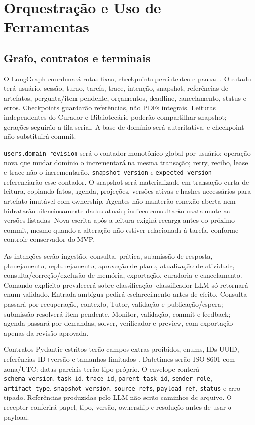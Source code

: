 \documentclass[12pt]{article}
\let\cite\citep
\newcommand{\code}[1]{\nolinkurl{#1}}
\begin{document}
\section{Orquestração e Uso de Ferramentas}
\label{sec:orquestracao}

\subsection{Grafo, contratos e terminais}

O LangGraph coordenará rotas fixas, checkpoints persistentes e pausas \cite{lgstate,lginterrupt}. O estado terá usuário, sessão, turno, tarefa, trace, intenção, snapshot, referências de artefatos, pergunta/item pendente, orçamentos, deadline, cancelamento, status e erros. Checkpoints guardarão referências, não PDFs integrais. Leituras independentes do Curador e Bibliotecário poderão compartilhar snapshot; gerações seguirão a fila serial. A base de domínio será autoritativa, e checkpoint não substituirá commit.

\code{users.domain_revision} será o contador monotônico global por usuário: operação nova que mudar domínio o incrementará na mesma transação; retry, recibo, lease e trace não o incrementarão. \code{snapshot_version} e \code{expected_version} referenciarão esse contador. O snapshot será materializado em transação curta de leitura, copiando fatos, agenda, projeções, versões ativas e hashes necessários para artefato imutável com ownership. Agentes não manterão conexão aberta nem hidratarão silenciosamente dados atuais; índices consultarão exatamente as versões listadas. Nova escrita após a leitura exigirá recarga antes do próximo commit, mesmo quando a alteração não estiver relacionada à tarefa, conforme controle conservador do MVP.

As intenções serão ingestão, consulta, prática, submissão de resposta, planejamento, replanejamento, aprovação de plano, atualização de atividade, consulta/correção/exclusão de memória, exportação, curadoria e cancelamento. Comando explícito prevalecerá sobre classificação; classificador LLM só retornará enum validado. Entrada ambígua pedirá esclarecimento antes de efeito. Consulta passará por recuperação, contexto, Tutor, validação e publicação/espera; submissão resolverá item pendente, Monitor, validação, commit e feedback; agenda passará por demandas, solver, verificador e preview, com exportação apenas da revisão aprovada.

Contratos Pydantic estritos terão campos extras proibidos, enums, IDs UUID, referências ID+versão e tamanhos limitados \cite{pydstrict}. Datetimes serão ISO-8601 com zona/UTC; datas parciais terão tipo próprio. O envelope conterá \code{schema_version}, \code{task_id}, \code{trace_id}, \code{parent_task_id}, \code{sender_role}, \code{artifact_type}, \code{snapshot_version}, \code{source_refs}, \code{payload_ref}, \code{status} e erro tipado. Referências produzidas pelo LLM não serão caminhos de arquivo. O receptor conferirá papel, tipo, versão, ownership e resolução antes de usar o payload.
\end{document}
